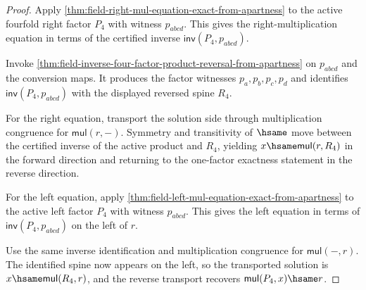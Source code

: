\begin{proof}
Apply \autoref{thm:field-right-mul-equation-exact-from-apartness} to the
active fourfold right factor $P_4$ with witness $p_{abcd}$. This gives the
right-multiplication equation in terms of the certified inverse
$\mathsf{inv}(P_4,p_{abcd})$.

Invoke
\autoref{thm:field-inverse-four-factor-product-reversal-from-apartness} on
$p_{abcd}$ and the conversion maps. It produces the factor witnesses
$p_a,p_b,p_c,p_d$ and identifies $\mathsf{inv}(P_4,p_{abcd})$ with the
displayed reversed spine $R_4$.

For the right equation, transport the solution side through multiplication
congruence for $\mathsf{mul}(r,-)$. Symmetry and transitivity of $\hsame$
move between the certified inverse of the active product and $R_4$, yielding
$x\hsame\mathsf{mul}(r,R_4)$ in the forward direction and returning to the
one-factor exactness statement in the reverse direction.

For the left equation, apply
\autoref{thm:field-left-mul-equation-exact-from-apartness} to the active left
factor $P_4$ with witness $p_{abcd}$. This gives the left equation in terms of
$\mathsf{inv}(P_4,p_{abcd})$ on the left of $r$.

Use the same inverse identification and multiplication congruence for
$\mathsf{mul}(-,r)$. The identified spine now appears on the left, so the
transported solution is $x\hsame\mathsf{mul}(R_4,r)$, and the reverse transport
recovers $\mathsf{mul}(P_4,x)\hsame r$.
\end{proof}

